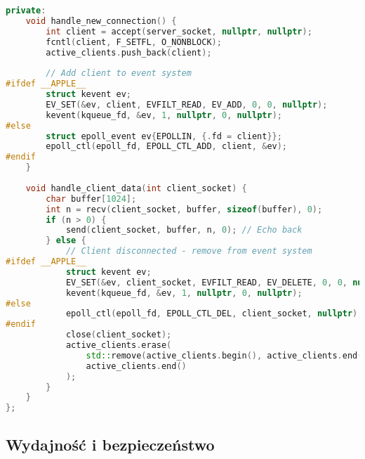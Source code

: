 \begin{lstlisting}[language=C++, style=VS2017,  caption={Async Echo Serwer w C++ z event loop}, label={lst:cpp_async_echo_server}]
private:
    void handle_new_connection() {
        int client = accept(server_socket, nullptr, nullptr);
        fcntl(client, F_SETFL, O_NONBLOCK);
        active_clients.push_back(client);
        
        // Add client to event system
#ifdef __APPLE__
        struct kevent ev;
        EV_SET(&ev, client, EVFILT_READ, EV_ADD, 0, 0, nullptr);
        kevent(kqueue_fd, &ev, 1, nullptr, 0, nullptr);
#else
        struct epoll_event ev{EPOLLIN, {.fd = client}};
        epoll_ctl(epoll_fd, EPOLL_CTL_ADD, client, &ev);
#endif
    }
    
    void handle_client_data(int client_socket) {
        char buffer[1024];
        int n = recv(client_socket, buffer, sizeof(buffer), 0);
        if (n > 0) {
            send(client_socket, buffer, n, 0); // Echo back
        } else {
            // Client disconnected - remove from event system
#ifdef __APPLE__
            struct kevent ev;
            EV_SET(&ev, client_socket, EVFILT_READ, EV_DELETE, 0, 0, nullptr);
            kevent(kqueue_fd, &ev, 1, nullptr, 0, nullptr);
#else
            epoll_ctl(epoll_fd, EPOLL_CTL_DEL, client_socket, nullptr);
#endif
            close(client_socket);
            active_clients.erase(
                std::remove(active_clients.begin(), active_clients.end(), client_socket),
                active_clients.end()
            );
        }
    }
};
\end{lstlisting}

\subsection{Wydajność i bezpieczeństwo}

